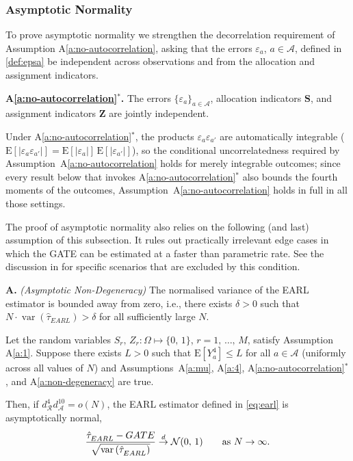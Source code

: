 \documentclass[sigconf,nonacm]{acmart}
\newcounter{assumption}
\newenvironment{assumption}{\refstepcounter{assumption}\par\medskip\noindent\textbf{A\theassumption.}\enspace}{\par\medskip}
\newenvironment{assumptionstar}[1]{\par\medskip\noindent\textbf{#1.}\enspace}{\par\medskip}
\newcommand{\E}{\mathrm E}
\DeclareMathOperator{\var}{var}
\begin{document}
\subsubsection{Asymptotic Normality}

To prove asymptotic normality we strengthen the decorrelation requirement of Assumption A\ref{a:no-autocorrelation}, asking that the errors $\varepsilon_a$, $a\in\mathcal A$, defined in \eqref{def:epsa} be independent across observations and from the allocation and assignment indicators.

\begin{assumptionstar}{A\ref{a:no-autocorrelation}$^*$}
The errors $\{\varepsilon_a\}_{a\in\mathcal A}$, allocation indicators $\mathbf S$, and assignment indicators $\mathbf Z$ are jointly independent.
\end{assumptionstar}

Under A\ref{a:no-autocorrelation}$^*$, the products $\varepsilon_a\varepsilon_{a'}$ are automatically integrable ($\E[|\varepsilon_a\varepsilon_{a'}|] = \E[|\varepsilon_a|]\,\E[|\varepsilon_{a'}|]$), so the conditional uncorrelatedness required by Assumption~A\ref{a:no-autocorrelation} holds for merely integrable outcomes; since every result below that invokes A\ref{a:no-autocorrelation}$^*$ also bounds the fourth moments of the outcomes, Assumption~A\ref{a:no-autocorrelation} holds in full in all those settings.

The proof of asymptotic normality also relies on the following (and last) assumption of this subsection. It rules out practically irrelevant edge cases in which the GATE can be estimated at a faster than parametric rate. See the discussion in \cite[p.~475]{harshaw2023erl} for specific scenarios that are excluded by this condition.

\begin{assumption}\label{a:non-degeneracy} \textit{(Asymptotic Non-Degeneracy)} The normalised variance of the EARL estimator is bounded away from zero, i.e., there exists $\delta >0$ such that $N\cdot\var(\hat\tau_{EARL}) > \delta$ for all sufficiently large $N$.
\end{assumption}

\begin{theorem}\label{th:asymptotic-normality}
    Let the random variables $S_r,\,Z_r\colon\Omega\mapsto\{0,\,1\}$, $r=1,\,\ldots,\,M$, satisfy Assumption A\ref{a:1}. Suppose there exists $L>0$ such that $\E[Y_a^4] \le L$ for all $a\in\mathcal A$ (uniformly across all values of $N$) and Assumptions~A\ref{a:mu}, A\ref{a:4}, A\ref{a:no-autocorrelation}$^*$, and A\ref{a:non-degeneracy} are true.

    Then, if $d^{4}_{\mathcal{R}}d^{10}_{\mathcal{A}}=o(N)$, the EARL estimator defined in \eqref{eq:earl} is asymptotically normal,
    \begin{equation*}
        \frac{\hat\tau^{\phantom{1}}_{EARL} - GATE}{\sqrt{\var\left(\hat\tau^{\phantom{1}}_{EARL}\right)}}\stackrel{d}{\to} \mathcal{N}(0,\,1)\qquad \textup{as }N\to\infty.
    \end{equation*}
\end{theorem}
\end{document}
